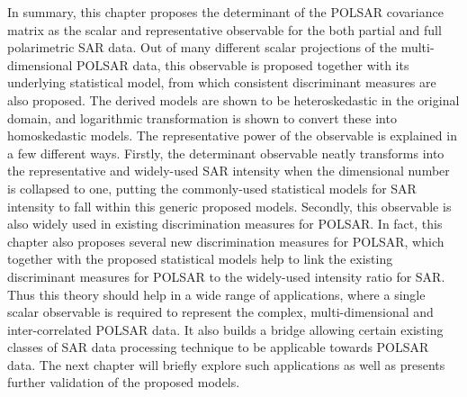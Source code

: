 %

In summary, this chapter proposes the determinant of the POLSAR covariance matrix as the scalar and representative observable for the both partial and full polarimetric SAR data.
Out of many different scalar projections of the multi-dimensional POLSAR data, this observable is proposed together with its underlying statistical model, from which consistent discriminant measures are also proposed.
The derived models are shown to be heteroskedastic in the original domain, and logarithmic transformation is shown to convert these into homoskedastic models.
The representative power of the observable is explained in a few different ways.
Firstly, the determinant observable neatly transforms into the representative and widely-used SAR intensity when the dimensional number is collapsed to one, putting the commonly-used statistical models for SAR intensity to fall within this generic proposed models.
Secondly, this observable is also  widely used in existing discrimination measures for POLSAR.
In fact, this chapter also proposes several new discrimination measures for POLSAR,
  which together with the proposed statistical models help to link the existing discriminant measures for POLSAR to the widely-used intensity ratio for SAR.
Thus this theory should help in a wide range of applications, where a single scalar observable is required to represent the complex, multi-dimensional and inter-correlated POLSAR data.
It also builds a bridge allowing  certain existing classes of SAR data processing technique to be applicable towards POLSAR data.
The next chapter will briefly explore such applications as well as presents further validation of the proposed models.
                
